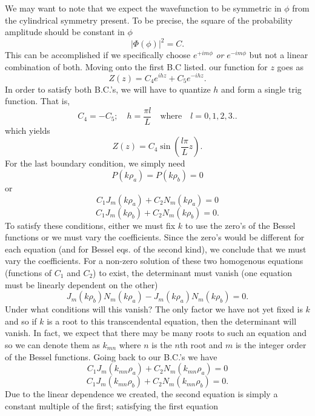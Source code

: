 \documentclass[11pt,letterpaper]{article}
\begin{document}
               	We may want to note that we expect the wavefunction to be symmetric in $\phi$ from the cylindrical symmetry present. To be 	
		precise, the square of the probability amplitude should be constant in $\phi$
		\[
                		|\Phi(\phi)|^2 = C.
		\]
		This can be accomplished if we specifically choose $e^{+im\phi}$ \emph{or} $e^{-im\phi}$ but not a linear combination of 
		both. Moving onto the first B.C listed. our function for $z$ goes as
                \[
                		Z(z) = C_4e^{ihz}+C_5e^{-ihz}.
		\]
                In order to satisfy both B.C.'s, we will have to quantize $h$ and form a single trig function. That is,
                \[
                		C_4 = -C_5;\quad h = \frac{\pi l}{L}\quad\text{where}\quad l=0,1,2,3..
		\]
                which yields 
                \[
                		Z(z) = C_4\sin\left(\frac{l\pi}{L}z\right).
		\]
                For the last boundary condition, we simply need
                \[
                		P(k\rho_a) = P(k\rho_b) = 0
		\]
                or
                \[
                		C_1J_m(k\rho_a)+C_2N_m(k\rho_a) = 0
		\]
                \[
                		C_1J_m(k\rho_b)+C_2N_m(k\rho_b) = 0.
		\]
                To satisfy these conditions, either we must fix $k$ to use the zero's of the Bessel functions or we must vary the coefficients. Since 
                the zero's would be different for each equation (and for Bessel eqs. of the second kind), we conclude that we must vary the 
                coefficients. For a non-zero solution of these two homogenous equations (functions of $C_1$ and $C_2$) to exist, the determinant 
                must vanish (one equation must be linearly dependent on the other)
                \[
                		J_m(k\rho_b)N_m(k\rho_a)-J_m(k\rho_a)N_m(k\rho_b) = 0.
		\]
                Under what conditions will this vanish? The only factor we have not yet fixed is $k$ and so if $k$ is a root to this transcendental 
                equation, then the determinant will vanish. In fact, we expect that there may be many roots to such an equation and so we can 
                denote them as $k_{mn}$ where $n$ is the $n$th root and $m$ is the integer order of the Bessel functions. Going back to our B.C.'s 
                we have
                \[
                		C_1J_m(k_{mn}\rho_a)+C_2N_m(k_{mn}\rho_a) = 0
		\]
                \[
                		C_1J_m(k_{mn}\rho_b)+C_2N_m(k_{mn}\rho_b) = 0.
		\]
                Due to the linear dependence we created, the second equation is simply a constant multiple of the first; satisfying the first equation 
\end{document}
